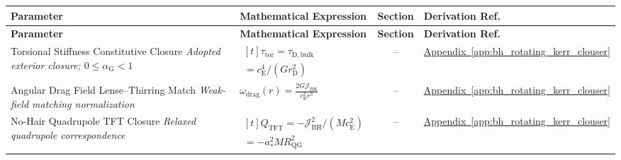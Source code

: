 \vspace{0.5cm}
\noindent
\begin{longtable}{@{} p{4.5cm} p{6cm} c p{4cm} @{}}
\toprule
\textbf{Parameter} & \textbf{Mathematical Expression} & \textbf{Section} & \textbf{Derivation Ref.} \\
\midrule
\endfirsthead
\toprule
\textbf{Parameter} & \textbf{Mathematical Expression} & \textbf{Section} & \textbf{Derivation Ref.} \\
\midrule
\endhead

{\raggedright Torsional Stiffness Constitutive Closure \newline \textit{Adopted exterior closure; $0\leq\alpha_{\mathrm G}<1$}\par} & {\raggedright $\begin{gathered}[t]\tau_{\mathrm{tor}}=\tau_{\mathrm{D,bulk}} \\ =c_{\mathrm E}^4/(Gr_{\mathrm D}^2)\end{gathered}$\par} & -- & {\raggedright \hyperref[app:bh_rotating_kerr_clouser]{Appendix~\ref*{app:bh_rotating_kerr_clouser}}\par} \\

{\raggedright Angular Drag Field Lense--Thirring Match \newline \textit{Weak-field matching normalization}\par} & {\raggedright $\omega_{\mathrm{drag}}(r) = \frac{2G\mathcal{J}_{\mathrm{BH}}}{c_{\mathrm{E}}^2r^3}$\par} & -- & {\raggedright \hyperref[app:bh_rotating_kerr_clouser]{Appendix~\ref*{app:bh_rotating_kerr_clouser}}\par} \\

{\raggedright No-Hair Quadrupole TFT Closure \newline \textit{Relaxed quadrupole correspondence}\par} & {\raggedright $\begin{gathered}[t]Q_{\mathrm{TFT}}=-\mathcal J_{\mathrm{BH}}^2/(Mc_{\mathrm E}^2) \\ =-a_*^2MR_{\mathrm{QG}}^2\end{gathered}$\par} & -- & {\raggedright \hyperref[app:bh_rotating_kerr_clouser]{Appendix~\ref*{app:bh_rotating_kerr_clouser}}\par} \\


\end{longtable}
